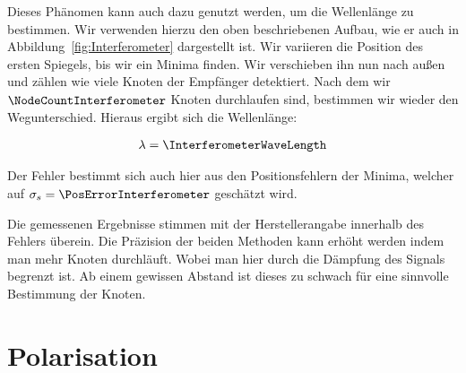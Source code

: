 \documentclass[a4paper,10pt,twocolumn]{article}
\begin{document}
    Dieses Phänomen kann auch dazu genutzt werden, um die Wellenlänge zu bestimmen.
    Wir verwenden hierzu den oben beschriebenen Aufbau, wie er auch in Abbildung~\ref{fig:Interferometer}
    dargestellt ist.
    Wir variieren die Position des ersten Spiegels, bis wir ein Minima finden.
    Wir verschieben ihn nun nach außen und zählen wie viele Knoten der Empfänger detektiert.
    Nach dem wir $\NodeCountInterferometer$ Knoten durchlaufen sind, bestimmen wir wieder den
    Wegunterschied.
    Hieraus ergibt sich die Wellenlänge:
    
    \begin{align*}
        \lambda = \InterferometerWaveLength
    \end{align*}
    
    Der Fehler bestimmt sich auch hier aus den Positionsfehlern der Minima, welcher
    auf $\sigma_s = \PosErrorInterferometer$ geschätzt wird.
    
    Die gemessenen Ergebnisse stimmen mit der Herstellerangabe innerhalb des Fehlers überein.
    Die Präzision der beiden Methoden kann erhöht werden indem man mehr Knoten durchläuft.
    Wobei man hier durch die Dämpfung des Signals begrenzt ist.
    Ab einem gewissen Abstand ist dieses zu schwach für eine sinnvolle Bestimmung der Knoten.
    
    \section{Polarisation}

    
    
\end{document}
